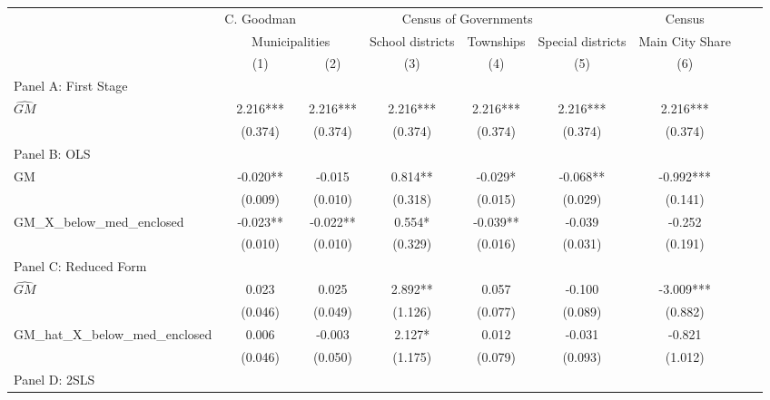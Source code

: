  \begin{tabular}{l*{8}{c}} \toprule
&\multicolumn{1}{c}{C. Goodman}&\multicolumn{4}{c}{Census of Governments}&\multicolumn{1}{c}{Census}\\\cmidrule(lr){2-2}\cmidrule(lr){3-6}\cmidrule(lr){7-7}
&\multicolumn{2}{c}{Municipalities}&\multicolumn{1}{c}{School districts}&\multicolumn{1}{c}{Townships}&\multicolumn{1}{c}{Special districts}&\multicolumn{1}{c}{Main City Share}\\\cmidrule(lr){2-3}\cmidrule(lr){4-6}\cmidrule(lr){7-7}
&\multicolumn{1}{c}{(1)}&\multicolumn{1}{c}{(2)}&\multicolumn{1}{c}{(3)}&\multicolumn{1}{c}{(4)}&\multicolumn{1}{c}{(5)}&\multicolumn{1}{c}{(6)}\\
\cmidrule(lr){1-7}
\multicolumn{6}{l}{Panel A: First Stage}\\
\cmidrule(lr){1-7}
$\widehat{GM}$  &    2.216***&    2.216***&    2.216***&    2.216***&    2.216***&    2.216***\\
                &  (0.374)   &  (0.374)   &  (0.374)   &  (0.374)   &  (0.374)   &  (0.374)   \\
\cmidrule(lr){1-7}
\multicolumn{6}{l}{Panel B: OLS}\\
\cmidrule(lr){1-7}
GM              &   -0.020** &   -0.015   &    0.814** &   -0.029*  &   -0.068** &   -0.992***\\
                &  (0.009)   &  (0.010)   &  (0.318)   &  (0.015)   &  (0.029)   &  (0.141)   \\
\addlinespace
GM\_X\_below\_med\_enclosed&   -0.023** &   -0.022** &    0.554*  &   -0.039** &   -0.039   &   -0.252   \\
                &  (0.010)   &  (0.010)   &  (0.329)   &  (0.016)   &  (0.031)   &  (0.191)   \\
\cmidrule(lr){1-7}
\multicolumn{6}{l}{Panel C: Reduced Form}\\
\cmidrule(lr){1-7}
$\widehat{GM}$  &    0.023   &    0.025   &    2.892** &    0.057   &   -0.100   &   -3.009***\\
                &  (0.046)   &  (0.049)   &  (1.126)   &  (0.077)   &  (0.089)   &  (0.882)   \\
\addlinespace
GM\_hat\_X\_below\_med\_enclosed&    0.006   &   -0.003   &    2.127*  &    0.012   &   -0.031   &   -0.821   \\
                &  (0.046)   &  (0.050)   &  (1.175)   &  (0.079)   &  (0.093)   &  (1.012)   \\
\cmidrule(lr){1-7}
\multicolumn{6}{l}{Panel D: 2SLS}\\

\end{tabular}
